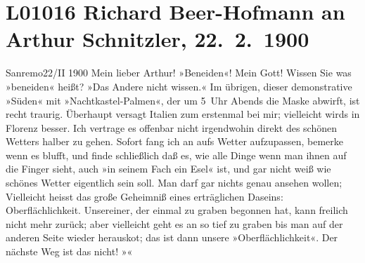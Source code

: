 

\section[Richard Beer-Hofmann an Arthur Schnitzler, 22. 2. 1900]{L01016 Richard Beer-Hofmann an Arthur Schnitzler, 22. 2. 1900}
\nopagebreak{}
\rehead{ }\normalsize\beginnumbering{}
\toendnotes[C]{\smallbreak\pagebreak[2]}
\toendnotes[C]{\smallbreak}
\pstart
           \raggedleft{}{\pb}Sanremo22/II 1900\pend
           \vspace{0.5em}
\pstart
           Mein lieber Arthur! »Beneiden«! Mein Gott! Wissen Sie was »beneiden«
               heißt? »Das Andere nicht wissen.« Im übrigen, dieser demonstrative »Süden« mit
               »Nachtkastel-Palmen«, der um 5 Uhr Abends die Maske abwirft, ist recht traurig.
               Überhaupt versagt Italien zum erstenmal bei
               mir; vielleicht wirds in Florenz besser. Ich
               vertrage es offenbar nicht irgendwohin direkt des schönen Wetters halber zu gehen.
               Sofort fang ich an aufs Wetter aufzupassen, bemerke wenn es blufft, und finde
               schließlich daß es, wie alle Dinge wenn man ihnen auf die Finger sieht, auch »in
               seinem Fach ein Esel« ist, und gar nicht weiß wie schönes Wetter eigentlich sein
               soll. Man darf gar nichts genau ansehen wollen; {\pb}Vielleicht heisst das große
               Geheimniß eines erträglichen Daseins: Oberflächlichkeit. Unsereiner, der einmal zu
               graben begonnen hat, kann freilich nicht mehr zurück; aber vielleicht geht es an so
               tief zu graben bis man auf der anderen Seite wieder herausko{\geminationm}t; das ist dann unsere »Oberflächlichkeit«. Der nächste
               Weg ist das nicht! »\label{K_L01016-1v}\label{K_L01016-1}«\pend
           
